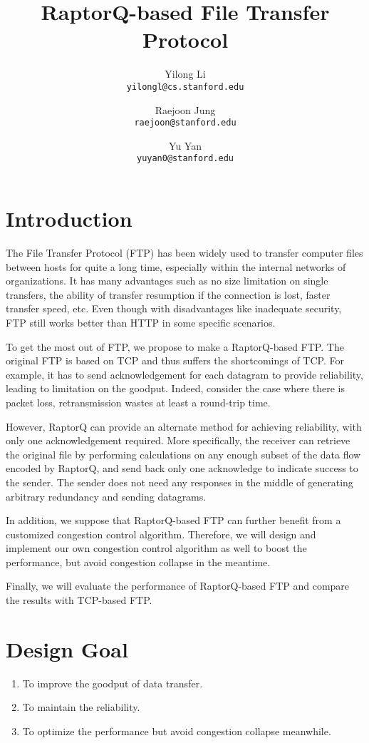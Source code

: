 \documentclass{sig-alternate-10pt}
\begin{document}
\title{RaptorQ-based File Transfer Protocol}
\author{
  Yilong Li\\
  \texttt{yilongl@cs.stanford.edu}
  \and 
  Raejoon Jung\\
  \texttt{raejoon@stanford.edu}
  \and
  Yu Yan\\
  \texttt{yuyan0@stanford.edu}
}

\maketitle
\section{Introduction}
The File Transfer Protocol (FTP) has been widely used to transfer computer files between hosts for quite a long time, especially within the internal networks of organizations. It has many advantages such as no size limitation on single transfers, the ability of transfer resumption if the connection is lost, faster transfer speed, etc. Even though with disadvantages like inadequate security, FTP still works better than HTTP in some specific scenarios.

To get the most out of FTP, we propose to make a RaptorQ-based FTP. The original FTP is based on TCP and thus suffers the shortcomings of TCP. For example, it has to send acknowledgement for each datagram to provide reliability, leading to limitation on the goodput. Indeed, consider the case where there is packet loss, retransmission wastes at least a round-trip time. 

However, RaptorQ can provide an alternate method for achieving reliability, with only one acknowledgement required. More specifically, the receiver can retrieve the original file by performing calculations on any enough subset of the data flow encoded by RaptorQ, and send back only one acknowledge to indicate success to the sender. The sender does not need any responses in the middle of generating arbitrary redundancy and sending datagrams. 

In addition, we suppose that RaptorQ-based FTP can further benefit from a customized congestion control algorithm. Therefore, we will design and implement our own congestion control algorithm as well to boost the performance, but avoid congestion collapse in the meantime.

Finally, we will evaluate the performance of RaptorQ-based FTP and compare the results with TCP-based FTP.

\section{Design Goal}
\begin{enumerate}
\item To improve the goodput of data transfer.
\item To maintain the reliability.
\item To optimize the performance but avoid congestion collapse meanwhile.
\end{enumerate}
\end{document}
